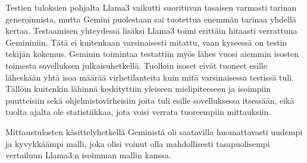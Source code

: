 Testien tuloksien pohjalta Llama3 vaikutti suorituvan tasaisen varmasti tarinan
generoinnista, mutta Gemini puolestaan sai tuotettua enemmän tarinaa yhdellä
kertaa. Testaamisen yhteydessä lisäksi Llama3 toimi erittäin hitaasti
verrattuna Gemininiin. Tätä ei kuitenkaan varsinaisesti mitattu, vaan kyseessä
on testin tekijän kokemus. Geminin toimintaa testattiin myös lähes vuosi
aiemmin isosten toimesta sovelluksen julkaisuhetkellä. Tuolloin isoset eivät
tuoneet esille läheskään yhtä isoa määrää virhetilanteita kuin mitä
varsinaisessa testissä tuli. Tällöin kuitenkin lähinnä keskityttiin yleiseen
mielipiteeseen ja isoimpiin puutteisiin sekä ohjelmistovirheisiin joita tuli
esille sovelluksessa itsessään, eikä tuolta ajalta ole statistiikkaa, jota
voisi verrata tuoreempiin mittauksiin.

Mittaustulosten käsittelyhetkellä Geministä oli saatavilla huomattavasti
uudempi ja kyvykkäämpi malli, joka olisi voinut olla mahdollisesti
tasapuolisempi vertailuun Llama3:n isoimman mallin kanssa. \parencite{gemini2}
